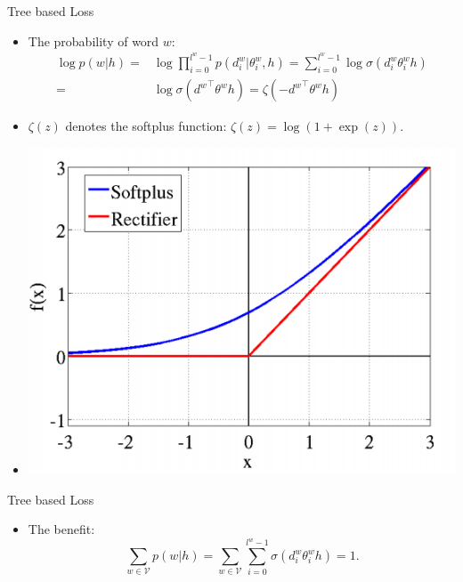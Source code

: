 \documentclass[english]{beamer} %
\begin{document}
\begin{frame}[<+->]{Tree based Loss}
\begin{itemize}
  \item The probability of word $w$:
\begin{equation}\label{equ:pw}
\begin{split}
 \log p(w|h)=&\log\prod_{i=0}^{l^w-1} p(d^w_i|\theta_{i}^w,h) = \sum_{i=0}^{l^w -1} \log\sigma(d_i^w \theta_{i}^w h)\\
 =&\log\sigma({d^w}^\top \theta^w h)=\zeta(- {d^w}^\top \theta^w h )
 \end{split}
\end{equation}
\item  $\zeta(z)$ denotes the softplus function: $\zeta(z)= \log (1+\exp(z))$.
\item \begin{center}
    \includegraphics[scale=0.3]{softplus.png}
  \end{center}
\end{itemize}
\end{frame}


\begin{frame}[<+->]{Tree based Loss}
\begin{itemize}

\item The benefit:\begin{equation}
\sum_{w\in \mathcal{V}}{p(w|h)}=\sum_{w \in \mathcal{V}}\sum_{i=0}^{l^w-1}{\sigma(d_i^w\theta_{i}^w h)}=1.
\end{equation}
\end{itemize}
\end{frame}
\end{document}
